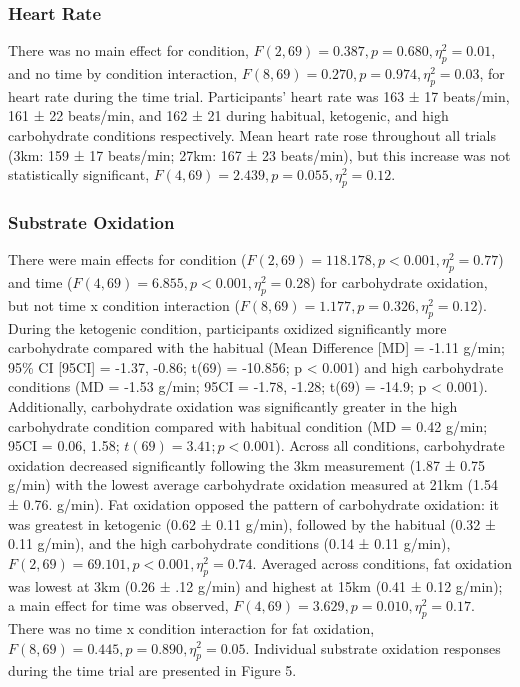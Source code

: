 \documentclass[]{cik}%
\begin{document}
\hypertarget{heart-rate}{%
\subsubsection{Heart Rate}\label{heart-rate}}

There was no main effect for condition,
\(F(2, 69) = 0.387, p = 0.680, \eta^2_p = 0.01\), and no time by
condition interaction, \(F(8, 69) = 0.270, p = 0.974, \eta^2_p = 0.03\),
for heart rate during the time trial. Participants' heart rate was 163 ±
17 beats/min, 161 ± 22 beats/min, and 162 ± 21 during habitual,
ketogenic, and high carbohydrate conditions respectively. Mean heart
rate rose throughout all trials (3km: 159 ± 17 beats/min; 27km: 167 ± 23
beats/min), but this increase was not statistically significant,
\(F(4, 69) = 2.439, p = 0.055, \eta^2_p = 0.12\).

\hypertarget{substrate-oxidation}{%
\subsubsection{Substrate Oxidation}\label{substrate-oxidation}}

There were main effects for condition
(\(F(2, 69) = 118.178, p < 0.001, \eta^2_p = 0.77\)) and time
(\(F(4, 69) = 6.855, p < 0.001, \eta^2_p = 0.28\)) for carbohydrate
oxidation, but not time x condition interaction
(\(F(8, 69) = 1.177, p = 0.326, \eta^2_p = 0.12\)). During the ketogenic
condition, participants oxidized significantly more carbohydrate
compared with the habitual (Mean Difference {[}MD{]} = -1.11 g/min; 95\%
CI {[}95CI{]} = -1.37, -0.86; t(69) = -10.856; p \textless{} 0.001) and
high carbohydrate conditions (MD = -1.53 g/min; 95CI = -1.78, -1.28;
t(69) = -14.9; p \textless{} 0.001). Additionally, carbohydrate
oxidation was significantly greater in the high carbohydrate condition
compared with habitual condition (MD = 0.42 g/min; 95CI = 0.06, 1.58;
\(t(69) = 3.41; p < 0.001\)). Across all conditions, carbohydrate
oxidation decreased significantly following the 3km measurement (1.87 ±
0.75 g/min) with the lowest average carbohydrate oxidation measured at
21km (1.54 ± 0.76. g/min). Fat oxidation opposed the pattern of
carbohydrate oxidation: it was greatest in ketogenic (0.62 ± 0.11
g/min), followed by the habitual (0.32 ± 0.11 g/min), and the high
carbohydrate conditions (0.14 ± 0.11 g/min),
\(F(2, 69) = 69.101, p < 0.001, \eta^2_p = 0.74\). Averaged across
conditions, fat oxidation was lowest at 3km (0.26 ± .12 g/min) and
highest at 15km (0.41 ± 0.12 g/min); a main effect for time was
observed, \(F(4, 69) = 3.629, p = 0.010, \eta^2_p = 0.17\). There was no
time x condition interaction for fat oxidation,
\(F(8, 69) = 0.445, p = 0.890, \eta^2_p = 0.05\). Individual substrate
oxidation responses during the time trial are presented in Figure 5.
\end{document}

